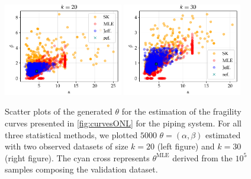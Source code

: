 \begin{figure}[h!]%
    \centering%
    \includegraphics[width=5.2cm]{figures/PREM/asg/PGA20scatter.pdf}\hspace*{0.5cm}
    \includegraphics[width=5.2cm]{figures/PREM/asg/PGA30scatter.pdf}
    \caption{Scatter plots of the generated $\theta$ for the estimation of the fragility curves presented in \cref{fig:curvesONL} for the piping system. For all three statistical methods, we plotted $5000$  $\theta=(\alpha,\beta)$ {estimated} with two observed datasets of size $k=20$ (left figure) and $k=30$ (right figure). The cyan cross represents $\theta^{\mathrm{MLE}}$ derived from the $10^5$ samples composing the validation dataset.}
    \label{fig:ASG-scatter}
\end{figure}






